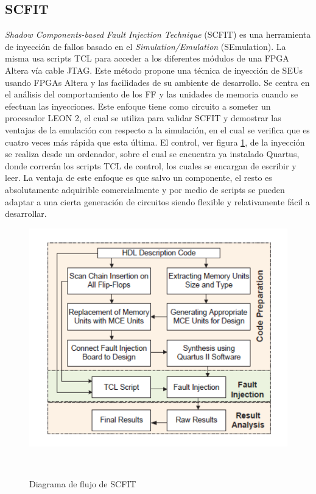 \documentclass[a4paper,openright,12pt]{report}
\begin{document}
\subsection{SCFIT} 
\textit{Shadow Components-based Fault Injection Technique} (SCFIT)\cite{6176538} es una herramienta de inyección de fallos basado en el \textit{Simulation/Emulation} (SEmulation). La misma usa scripts TCL para acceder a los diferentes módulos de una FPGA Altera vía  cable JTAG.
Este método propone una técnica de inyección de SEUs usando FPGAs Altera y las facilidades de su ambiente de desarrollo. Se centra en el análisis del comportamiento de los FF y las unidades de memoria cuando se efectuan las inyecciones. Este enfoque tiene como circuito a someter un procesador LEON 2, el cual se utiliza para validar SCFIT y demostrar las ventajas de la emulación con respecto a la simulación, en el cual se verifica que es cuatro veces más rápida que esta última.
El control, ver figura \ref{SCFIT},  de la inyección se realiza desde un ordenador, sobre el cual se encuentra ya instalado Quartus, donde correrán los  scripts TCL de control, los cuales se encargan de escribir y leer.
La ventaja de este enfoque es que salvo un componente, el resto es absolutamente adquirible comercialmente y por medio de scripts se pueden adaptar a una cierta generación de circuitos siendo flexible y relativamente fácil a desarrollar.


\begin{figure}[H]
	\centering
	\includegraphics[width=0.70 \textwidth]{img/SCFIT.pdf}
	\caption{Diagrama de flujo de SCFIT}
     ~\cite{Alderighi2010}
	\label{SCFIT}
\end{figure}
\end{document}
